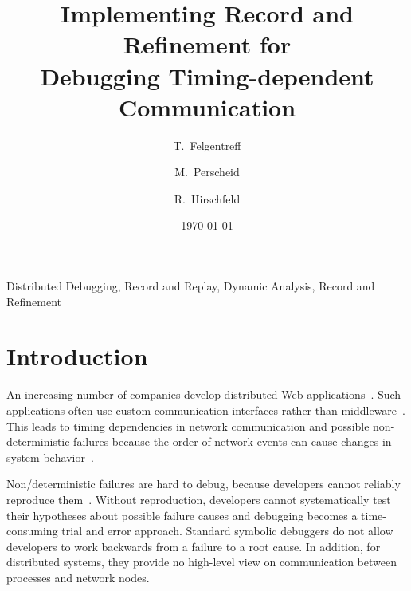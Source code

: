 \documentclass[preprint,3p]{elsarticle}
\newcommand{\doctitle}{Implementing Record and Refinement for\\
  Debugging Timing-dependent Communication}
\newcommand{\dockeywords}{Distributed Debugging, Record and Replay,
  Dynamic Analysis, Record and Refinement}
\begin{document}
\begin{frontmatter}

\title{\doctitle}
\author[hpi]{T.~Felgentreff}
\author[hpi]{M.~Perscheid}
\author[hpi]{R.~Hirschfeld}

\address[hpi]{Software Architecture Group,~%
  Hasso-Plattner Institute,\\%
  Prof.-Dr.-Helmert Str. 2-3,~%
  University of Potsdam, Germany%
}
\date{\today}

\begin{abstract}
  
\end{abstract}

\begin{keyword}
\dockeywords
\end{keyword}

\end{frontmatter}

\section{Introduction}
\label{sec:introduction}

An increasing number of companies develop distributed Web
applications~\cite{kondo2009cost}. 
Such applications
often use custom communication interfaces rather than
middleware~\cite{Nadiminti}. 
This leads to
timing dependencies in network communication and possible 
non-deterministic failures because the order of network events can cause 
changes in system behavior~\cite{Artho2003}.

Non\-/deterministic failures are hard to debug, because developers
cannot reliably reproduce them~\cite{zeller2009programs}. Without
reproduction, developers cannot systematically test their hypotheses
about possible failure causes and debugging becomes a time-consuming
trial and error approach. Standard symbolic debuggers do not allow
developers to work backwards from a failure to a root cause. In
addition, for distributed systems, they provide no high-level view on
communication between processes and network nodes.
\end{document}
